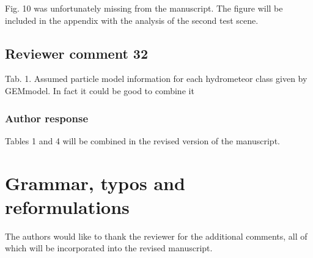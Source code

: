 \documentclass[11pt]{scrartcl}
\begin{document}
Fig. 10 was unfortunately missing from the manuscript. The figure will be included in the appendix
with the analysis of the second test scene.

\subsection*{Reviewer comment 32}

Tab. 1. Assumed particle model information for each hydrometeor class given by GEMmodel. In fact it could be good to combine it

\subsubsection*{Author response}

Tables 1 and 4 will be combined in the revised version of the manuscript.


\section*{Grammar, typos and reformulations}

The authors would like to thank the reviewer for the additional comments, all of
which will be incorporated into the revised manuscript.




\end{document}
